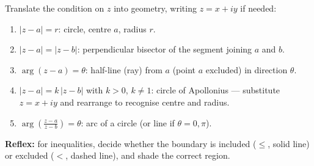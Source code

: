 \documentclass[11pt]{article}
\newcommand{\cle}[1]{{\popxbold\color{popdark}#1}}
\begin{document}
\begin{methode}
Translate the condition on $z$ into geometry, writing $z = x + iy$ if needed:
\begin{enumerate}
\item $|z - a| = r$: \cle{circle}, centre $a$, radius $r$.
\item $|z - a| = |z - b|$: \cle{perpendicular bisector} of the segment joining $a$ and $b$.
\item $\arg(z - a) = \theta$: \cle{half-line} (ray) from $a$ (point $a$ excluded) in direction $\theta$.
\item $|z - a| = k\,|z - b|$ with $k > 0$, $k \neq 1$: circle of Apollonius — substitute $z = x + iy$ and rearrange to recognise centre and radius.
\item $\arg\left(\frac{z-a}{z-b}\right) = \theta$: arc of a circle (or line if $\theta = 0,\pi$).
\end{enumerate}
\textbf{Reflex:} for inequalities, decide whether the boundary is included ($\leq$, solid line) or excluded ($<$, dashed line), and shade the correct region.
\end{methode}
\end{document}
